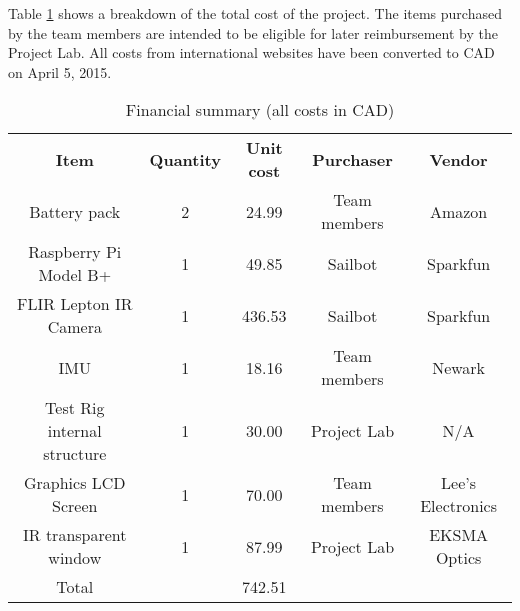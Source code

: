 
Table \ref{tab:financialsummary} shows a breakdown of the total cost of the project. The items purchased by the team members are intended to be eligible for later reimbursement by the Project Lab. All costs from international websites have been converted to CAD on April 5, 2015.

\begin{table}[H]
\caption[Financial summary]{\label{tab:financialsummary}Financial summary (all costs in CAD)}
\begin{tabular}{c|c|c|c|c}
\textbf{Item} & \textbf{Quantity} & \textbf{Unit cost} & \textbf{Purchaser} & \textbf{Vendor}\\
Battery pack & 2 & 24.99 & Team members & Amazon\\
Raspberry Pi Model B+ & 1 & 49.85 & Sailbot & Sparkfun\\
FLIR Lepton IR Camera & 1 & 436.53 & Sailbot & Sparkfun\\
IMU & 1 & 18.16 & Team members & Newark\\
Test Rig internal structure & 1 & 30.00 & Project Lab & N/A\\
Graphics LCD Screen & 1 & 70.00 & Team members & Lee's Electronics\\
IR transparent window & 1 & 87.99 & Project Lab & EKSMA Optics\\\hline
Total & & 742.51 & & \\

\end{tabular}
\end{table}